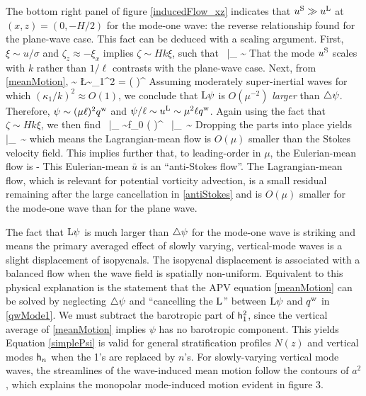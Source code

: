 \documentclass[12pt, oneside]{book}
\begin{document}
The bottom right panel of figure \ref{inducedFlow_xz} indicates that $u^{\mathrm{S}} \gg u^{\mathrm{L}}$ at $(x,z)=(0,-H/2)$ for the mode-one wave: the reverse relationship found for the plane-wave case.  This fact can be deduced with a scaling argument.  First, $\xi \sim u / \sigma$ and $\zeta_z \approx - \xi_x$ implies $\zeta \sim H k \xi$, such that
\beq
\uS  \, \big |_{} \sim  {} \per
\eeq
That the mode $u^{\mathrm{S}}$ scales with $k$ rather than $1/\ell$ contrasts with the plane-wave case.  Next, from \eqref{meanMotion},
\beq
\hlap \psi \sim {} \com \qquad {} \qquad \L \psi \sim \kappa_1^2 \psi =  \left (  \right )^{} \psi \per
\eeq
Assuming moderately super-inertial waves for which $(\kappa_1/k)^2 \approx O(1)$, we conclude that $\mathrm{L} \psi$ is $O \left ( \mu^{-2} \right )$ {\it larger} than $\triangle \psi$.  Therefore, $\psi \sim (\mu \ell)^2 q^{\mathrm{w}}$ and $\psi / \ell \sim u^{\mathrm{L}} \sim \mu^2 \ell q^{\mathrm{w}}$.  Again using the fact that $\zeta \sim H k \xi$, we then find
\beq
\qdag \, \big |_{} \sim f_0 \left (  \right )^{} \com \qquad {} \qquad \uL \, \big |_{\, }  \sim {} \per
\eeq
Dropping the parts into place yields 
\beq
\frac{\uL}{\uS} \: \Big |_{\, } \sim {} \com
\eeq
which means the Lagrangian-mean flow is $O(\mu)$ smaller than the Stokes velocity field.  This implies further that, to leading-order in $\mu$, the Eulerian-mean flow is
\beq
\avu \approx - \uS \per
\label{antiStokes}
\eeq
This Eulerian-mean $\bar u$ is an ``anti-Stokes flow''.  The Lagrangian-mean flow, which is relevant for potential vorticity advection, is a small residual remaining after the large cancellation in \eqref{antiStokes} and is $O(\mu)$ smaller for the mode-one wave than for the plane wave.

The fact that $\mathrm{L} \psi$ is much larger than $\triangle \psi$ for the mode-one wave is striking and means the primary averaged effect of slowly varying, vertical-mode waves is a slight displacement of isopycnals.  The isopycnal displacement is associated with a balanced flow when the wave field is spatially non-uniform.  Equivalent to this physical explanation is the statement that the APV equation \eqref{meanMotion} can be solved by neglecting $\triangle \psi$ and  ``cancelling the $\mathrm{L}$'' between $\mathrm{L} \psi$ and $q^{\mathrm{w}}$ in \eqref{qwMode1}.  We must subtract the barotropic part of $\mathsf{h}_1^2$, since the vertical average of \eqref{meanMotion} implies $\psi$ has no barotropic component.  This yields
\beq
\psi \; \approx \;    \per
\label{simplePsi}
\eeq
Equation \eqref{simplePsi} is valid for general stratification profiles $N(z)$ and vertical modes $\mathsf{h}_n$ when the 1's are replaced by $n$'s.  For slowly-varying vertical mode waves, the streamlines of the wave-induced mean motion follow the contours of $a^2$, which explains the monopolar mode-induced motion evident in figure 3.
\end{document}
